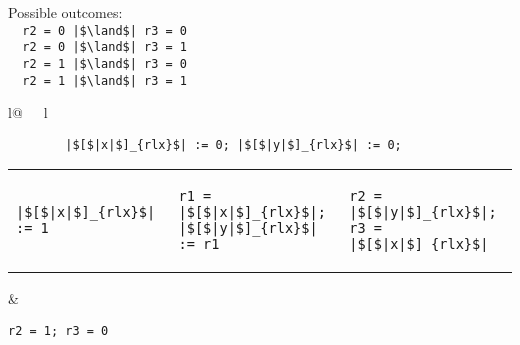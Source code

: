 \begin{minipage}[t]{0.3\linewidth}
Possible outcomes:\\
\lstinline{  r2 = 0 |$\land$| r3 = 0}\\
\lstinline{  r2 = 0 |$\land$| r3 = 1}\\
\lstinline{  r2 = 1 |$\land$| r3 = 0}\\
\lstinline{  r2 = 1 |$\land$| r3 = 1}\\
\end{minipage}
%
\begin{minipage}[t]{0.3\linewidth}
\vspace{-.2cm}
  \begin{tabular}{l@{\ \ \ }l}
    \begin{minipage}[l]{4.3cm} \small
\begin{lstlisting}
        |$[$|x|$]_{rlx}$| := 0; |$[$|y|$]_{rlx}$| := 0;
\end{lstlisting}
\vspace{-.2cm}
\begin{tabular}{l||l||l}
\begin{lstlisting}
|$[$|x|$]_{rlx}$| := 1
\end{lstlisting}
\hspace{.6cm}
&
\begin{lstlisting}
r1 = |$[$|x|$]_{rlx}$|;
|$[$|y|$]_{rlx}$| := r1
\end{lstlisting}
\hspace{.6cm}
&
\begin{lstlisting}
r2 = |$[$|y|$]_{rlx}$|;
r3 = |$[$|x|$]_{rlx}$|
\end{lstlisting}
\end{tabular}
    \end{minipage}
&
  \end{tabular}
\end{minipage}

\lstinline{r2 = 1; r3 = 0}
\litmusTestEnd

